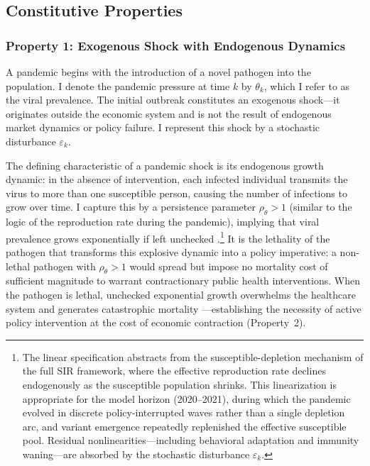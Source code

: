 \documentclass[12pt, a4paper]{article}
\begin{document}

\subsection{Constitutive Properties}
\label{subsec:properties}


\subsubsection*{Property 1: Exogenous Shock with Endogenous Dynamics}


A pandemic begins with the introduction of a novel pathogen into the population. I denote the pandemic pressure at time $k$ by $\theta_k$, which I refer to as the viral prevalence. The initial outbreak constitutes an exogenous shock---it originates outside the economic system and is not the result of endogenous market dynamics or policy failure. I represent this shock by a stochastic disturbance $\varepsilon_k$.

The defining characteristic of a pandemic shock is its endogenous growth dynamic: in the absence of intervention, each infected individual transmits the virus to more than one susceptible person, causing the number of infections to grow over time. I capture this by a persistence parameter $\rho_\theta > 1$ (similar to the logic of the reproduction rate during the pandemic), implying that viral prevalence grows exponentially if left unchecked \citep{Atkeson2020, alvarez2021, eichenbaum2021macro}.\footnote{The linear specification abstracts from the susceptible-depletion mechanism of the full SIR framework, where the effective reproduction rate declines endogenously as the susceptible population shrinks. This 
linearization is appropriate for the model horizon (2020--2021), during 
which the pandemic evolved in discrete policy-interrupted waves rather than 
a single depletion arc, and variant emergence repeatedly replenished the 
effective susceptible pool. Residual nonlinearities---including behavioral 
adaptation and immunity waning---are absorbed by the stochastic disturbance 
$\varepsilon_k$.} It is the lethality of the pathogen that transforms this explosive dynamic into a policy imperative: a non-lethal pathogen with $\rho_\theta > 1$ would spread but impose no mortality cost of sufficient magnitude to warrant contractionary public health interventions. When the pathogen is lethal, unchecked exponential growth overwhelms the healthcare system and generates catastrophic mortality \citep{Jones2021, Barro2020}---establishing the necessity of active policy intervention at the cost of economic contraction (Property~2).
\end{document}
